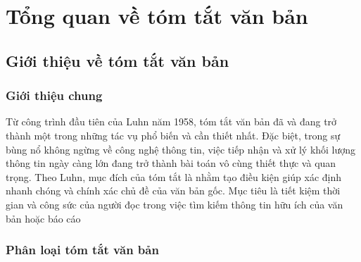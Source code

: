 \chapter{Tổng quan về tóm tắt văn bản}
\label{Chapter2}

\section{Giới thiệu về tóm tắt văn bản}
\subsection{Giới thiệu chung}
Từ công trình đầu tiên của Luhn năm 1958, tóm tắt văn bản đã và đang trở thành một trong những tác vụ phổ biến và cần thiết nhất. Đặc biệt, trong sự bùng nổ không ngừng về công nghệ thông tin, việc tiếp nhận và xử lý khối lượng thông tin ngày càng lớn đang trở thành bài toán vô cùng thiết thực và quan trọng. Theo Luhn, mục đích của tóm tắt là nhằm tạo điều kiện giúp xác định nhanh chóng và chính xác chủ đề của văn bản gốc. Mục tiêu là tiết kiệm thời gian và công sức của người đọc trong việc tìm kiếm thông tin hữu ích của văn bản hoặc báo cáo ~\cite{Luhn58}
\cite{199-TED}

\subsection{Phân loại tóm tắt văn bản}

